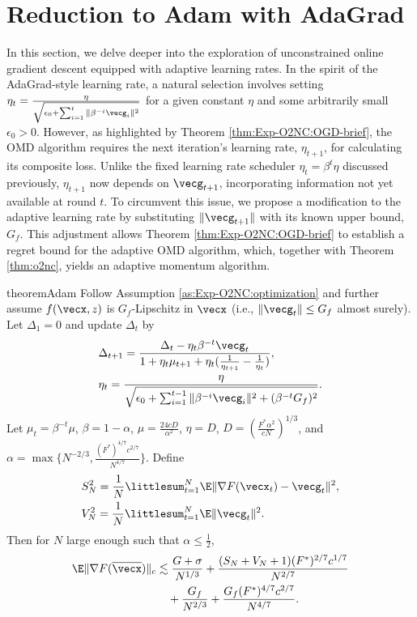 \section{Reduction to Adam with AdaGrad}
\label{sec:Exp-O2NC_adam}

In this section, we delve deeper into the exploration of unconstrained online gradient descent equipped with adaptive learning rates. In the spirit of the AdaGrad-style learning rate, a natural selection involves setting $\eta_t = \frac{\eta}{\sqrt{\epsilon_0 + \sum_{i=1}^t\|\beta^{-i}\vecg_i\|^2}}$ for a given constant $\eta$ and some arbitrarily small $\epsilon_0>0$. However, as highlighted by Theorem \ref{thm:Exp-O2NC:OGD-brief}, the OMD algorithm requires the next iteration's learning rate, $\eta_{t+1}$, for calculating its composite loss. Unlike the fixed learning rate scheduler $\eta_t=\beta^t\eta$ discussed previously, $\eta_{t+1}$ now depends on $\vecg_{t+1}$, incorporating information not yet available at round $t$. To circumvent this issue, we propose a modification to the adaptive learning rate by substituting $\|\vecg_{t+1}\|$ with its known upper bound, $G_f$. This adjustment allows Theorem \ref{thm:Exp-O2NC:OGD-brief} to establish a regret bound for the adaptive OMD algorithm, which, together with Theorem \ref{thm:o2nc}, yields an adaptive momentum algorithm.

\begin{restatable}{theorem}{Adam}
\label{thm:Exp-O2NC:adam}
Follow Assumption \ref{as:Exp-O2NC:optimization} and further assume $f(\vecx,z)$ is $G_f$-Lipschitz in $\vecx$ (i.e., $\|\vecg_t\| \le G_f$ almost surely). Let $\Delta_1=0$ and update $\Delta_t$ by
\begin{align*}
    &\Delta_{t+1} = \frac{\Delta_t - \eta_t\beta^{-t}\vecg_t}{1+\eta_t\mu_{t+1}+\eta_t(\frac{1}{\eta_{t+1}}-\frac{1}{\eta_t})}, \\
    &\eta_t = \frac{\eta}{\sqrt{\epsilon_0+\sum_{i=1}^{t-1}\|\beta^{-i}\vecg_i\|^2+(\beta^{-t}G_f)^2}}.
\end{align*}
Let $\mu_t=\beta^{-t}\mu$, $\beta=1-\alpha$, $\mu=\frac{24cD}{\alpha^2}$, $\eta=D$, $D=(\frac{F^*\alpha^2}{cN})^{1/3}$, and $\alpha=\max\{N^{-2/3}, \frac{(F^*)^{4/7}c^{2/7}}{N^{4/7}}\}$. Define
\begin{align*}
    &S_N^2=\frac{1}{N}\littlesum_{t=1}^N\E\|\nabla F(\vecx_t)-\vecg_t\|^2, \\
    &V_N^2 = \frac{1}{N}\littlesum_{t=1}^N\E\|\vecg_t\|^2.
\end{align*}
Then for $N$ large enough such that $\alpha \le \frac{1}{2}$,
\begin{align*}
    \E\|\nabla F(\overline\vecx)\|_c 
    &\lesssim \frac{G+\sigma}{N^{1/3}} + \frac{(S_N+V_N+1)(F^*)^{2/7}c^{1/7}}{N^{2/7}} \\
    &\quad + \frac{G_f}{N^{2/3}} + \frac{G_f(F^*)^{4/7}c^{2/7}}{N^{4/7}}.
\end{align*}
\end{restatable}

